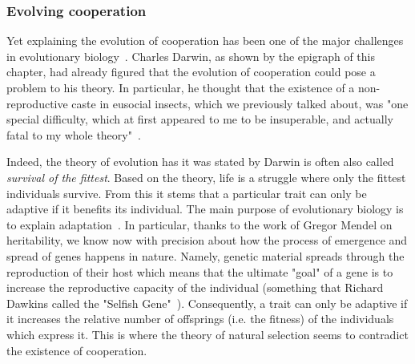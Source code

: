     \subsubsection{Evolving cooperation} Yet explaining the evolution of cooperation has been one of the major challenges in evolutionary biology~\parencite{Hamilton1964, Dugatkin2002, West2011a}. Charles Darwin, as shown by the epigraph of this chapter, had already figured that the evolution of cooperation could pose a problem to his theory. In particular, he thought that the existence of a non-reproductive caste in eusocial insects, which we previously talked about, was "one special difficulty, which at first appeared to me to be insuperable, and actually fatal to my whole theory"~\parencite{Darwin1859}. 

    Indeed, the theory of evolution has it was stated by Darwin is often also called \emph{survival of the fittest}. Based on the theory, life is a struggle where only the fittest individuals survive. From this it stems that a particular trait can only be adaptive if it benefits its individual. The main purpose of evolutionary biology is to explain adaptation~\parencite{West2011a}. In particular, thanks to the work of Gregor Mendel on heritability, we know now with precision about how the process of emergence and spread of genes happens in nature. Namely, genetic material spreads through the reproduction of their host which means that the ultimate "goal" of a gene is to increase the reproductive capacity of the individual (something that Richard Dawkins called the "Selfish Gene"~\parencite{Dawkins1976}). Consequently, a trait can only be adaptive if it increases the relative number of offsprings (i.e. the fitness) of the individuals which express it. This is where the theory of natural selection seems to contradict the existence of cooperation. 


